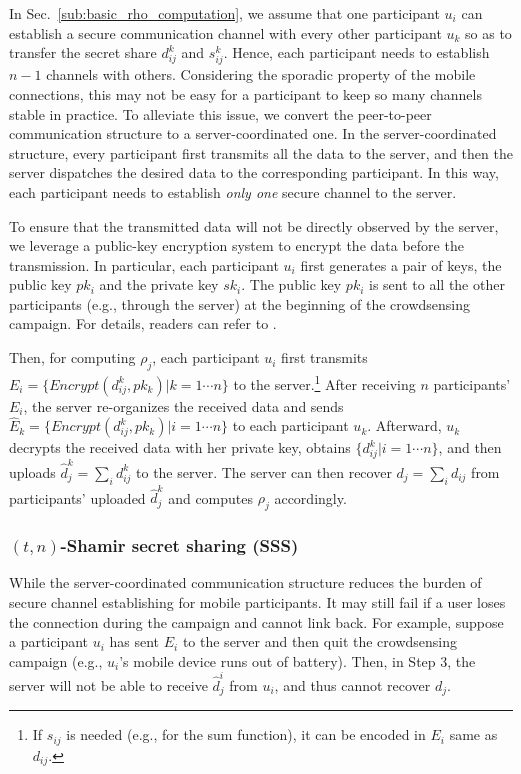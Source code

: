 \documentclass[11pt]{article}
\begin{document}
In Sec.~\ref{sub:basic_rho_computation}, we assume that one participant $u_i$ can establish a secure communication channel with every other participant $u_k$ so as to transfer the secret share $d_{ij}^k$ and $s_{ij}^k$. Hence, each participant needs to establish $n-1$ channels with others. Considering the sporadic property of the mobile connections, this may not be easy for a participant to keep so many channels stable in practice. To alleviate this issue, we convert the peer-to-peer communication structure to a server-coordinated one. In the server-coordinated structure, every participant first transmits all the data to the server, and then the server dispatches the desired data to the corresponding participant. In this way, each participant  needs to establish \textit{only one} secure channel to the server.

To ensure that the transmitted data will not be directly observed by the server, we leverage a public-key encryption system to encrypt the data before the transmission. In particular, each participant $u_i$ first generates a pair of keys, the public key $pk_i$ and the private key $sk_i$. The public key $pk_i$ is sent to all the other participants (e.g., through the server) at the beginning of the crowdsensing campaign. For details, readers can refer to \cite{Leye-Bonawitz2017PracticalSA}.

Then, for computing $\rho_j$, each participant $u_i$ first transmits $E_i = \{\textit{Encrypt}(d_{ij}^k, pk_k)| k = 1\cdots n\}$ to the server.\footnote{If $s_{ij}$ is needed (e.g., for the sum function), it can be encoded in $E_i$ same as $d_{ij}$.} After receiving $n$ participants' $E_i$, the server re-organizes the received data and sends $\hat E_k = \{\textit{Encrypt}(d_{ij}^k, pk_k)| i = 1\cdots n\}$ to each participant $u_k$. Afterward, $u_k$ decrypts the received data with her private key, obtains $\{d_{ij}^k| i = 1 \cdots n\}$, and then uploads $\hat d_j^k = \sum_i d_{ij}^k$ to the server. The server can then recover $d_j = \sum_i d_{ij}$ from participants' uploaded  $\hat d_j^k$ and computes $\rho_j$ accordingly.

\subsubsection{$(t,n)$-Shamir secret sharing (SSS)} While the server-coordinated communication structure reduces the burden of secure channel establishing for mobile participants. It may still fail if a user loses the connection during the campaign and cannot link back. For example, suppose a participant $u_i$ has sent $E_i$ to the server and then quit the crowdsensing campaign (e.g., $u_i$'s mobile device runs out of battery). Then, in Step 3, the server will not be able to receive $\hat d_j^i$ from $u_i$, and thus cannot recover $d_j$.
\end{document}
